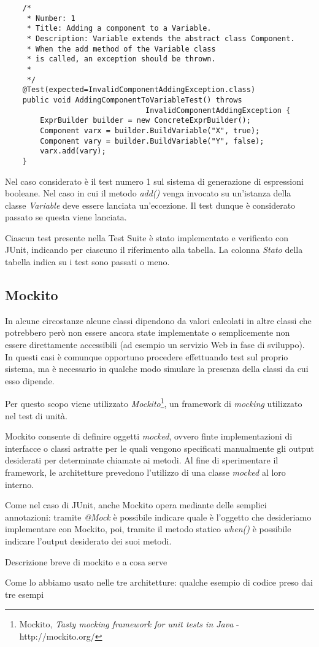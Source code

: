 \begin{lstlisting}
	/*
	 * Number: 1
	 * Title: Adding a component to a Variable.
	 * Description: Variable extends the abstract class Component. 
	 * When the add method of the Variable class 
	 * is called, an exception should be thrown.
	 * 
	 */
	@Test(expected=InvalidComponentAddingException.class)
	public void AddingComponentToVariableTest() throws 
								InvalidComponentAddingException {		
		ExprBuilder builder = new ConcreteExprBuilder();
		Component varx = builder.BuildVariable("X", true);
		Component vary = builder.BuildVariable("Y", false);
		varx.add(vary);
	}
\end{lstlisting}

Nel caso considerato è il test numero 1 sul sistema di generazione di espressioni booleane. Nel caso in cui il metodo \emph{add()} venga invocato su un'istanza della classe \emph{Variable} deve essere lanciata un'eccezione. Il test dunque è considerato passato se questa viene lanciata. 

Ciascun test presente nella Test Suite è stato implementato e verificato con JUnit, indicando per ciascuno il riferimento alla tabella. La colonna \emph{Stato} della tabella indica su i test sono passati o meno.

\subsection{Mockito}

In alcune circostanze alcune classi dipendono da valori calcolati in altre classi che potrebbero però non essere ancora state implementate o semplicemente non essere direttamente accessibili (ad esempio un servizio Web in fase di sviluppo). In questi casi è comunque opportuno procedere effettuando test sul proprio sistema, ma è necessario in qualche modo simulare la presenza della classi da cui esso dipende.

Per questo scopo viene utilizzato \emph{Mockito}\footnote{Mockito, \emph{Tasty mocking framework for unit tests in Java} - http://mockito.org/}, un framework di \emph{mocking} utilizzato nel test di unità.

Mockito consente di definire oggetti \emph{mocked}, ovvero finte implementazioni di interfacce o classi astratte per le quali vengono specificati manualmente gli output desiderati per determinate chiamate ai metodi. Al fine di sperimentare il framework, le architetture prevedono l'utilizzo di una classe \emph{mocked} al loro interno. 

Come nel caso di JUnit, anche Mockito opera mediante delle semplici annotazioni: tramite \emph{@Mock} è possibile indicare quale è l'oggetto che desideriamo implementare con Mockito, poi, tramite il metodo statico \emph{when()} è possibile indicare l'output desiderato dei suoi metodi.



Descrizione breve di mockito e a cosa serve

Come lo abbiamo usato nelle tre architetture: qualche esempio di codice preso dai tre esempi